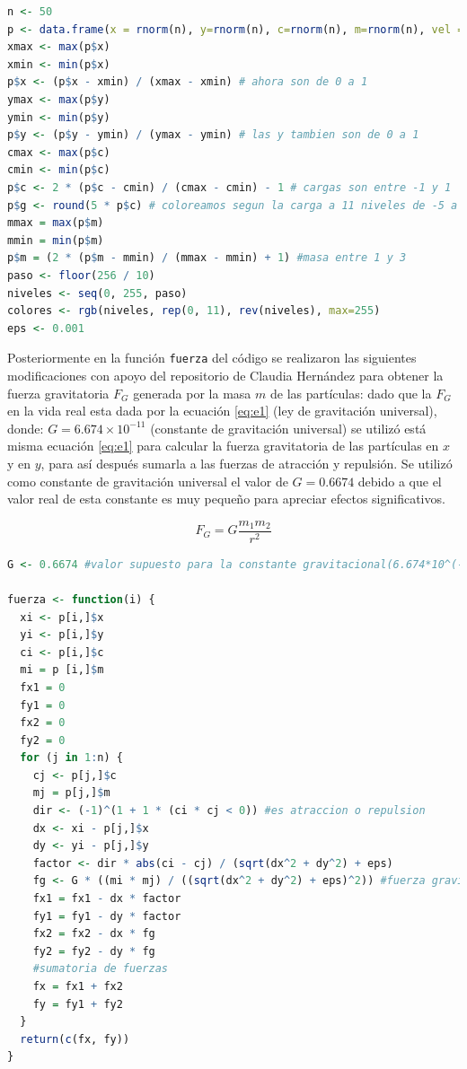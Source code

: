 \documentclass{article}
\begin{document}
\lstset{style=mystyle}
\begin{lstlisting}[language=R, caption= Código para agregar la masa $m$ con valores distribuidos normalmente al azar entre $1$ y $3$ .]
n <- 50
p <- data.frame(x = rnorm(n), y=rnorm(n), c=rnorm(n), m=rnorm(n), vel = numeric(n))
xmax <- max(p$x)
xmin <- min(p$x)
p$x <- (p$x - xmin) / (xmax - xmin) # ahora son de 0 a 1
ymax <- max(p$y)
ymin <- min(p$y)
p$y <- (p$y - ymin) / (ymax - ymin) # las y tambien son de 0 a 1
cmax <- max(p$c)
cmin <- min(p$c)
p$c <- 2 * (p$c - cmin) / (cmax - cmin) - 1 # cargas son entre -1 y 1
p$g <- round(5 * p$c) # coloreamos segun la carga a 11 niveles de -5 a 5
mmax = max(p$m) 
mmin = min(p$m)
p$m = (2 * (p$m - mmin) / (mmax - mmin) + 1) #masa entre 1 y 3
paso <- floor(256 / 10)
niveles <- seq(0, 255, paso)
colores <- rgb(niveles, rep(0, 11), rev(niveles), max=255)
eps <- 0.001
\end{lstlisting}

Posteriormente en la función \texttt{fuerza} del código se realizaron las siguientes modificaciones con apoyo del repositorio de Claudia Hernández \citep{2} para obtener la fuerza gravitatoria $F_G$ generada por la masa $m$ de las partículas: dado que la $F_G$ en la vida real esta dada por la ecuación \ref{eq:e1} (ley de gravitación universal), donde: $G= 6.674\times10^{-11}$ (constante de gravitación universal) se utilizó está misma ecuación \ref{eq:e1} para calcular la fuerza gravitatoria de las partículas en $x$ y en $y$, para así después sumarla a las fuerzas de atracción y repulsión. Se utilizó como constante de gravitación universal el valor de $G = 0.6674$ debido a que el valor real de esta constante es muy pequeño para apreciar efectos significativos.
 
\begin{equation}
\label{eq:e1}
F_G= G\frac{m_1 m_2}{r^{2}} 
\end{equation}

\newpage

\lstset{style=mystyle}
\begin{lstlisting}[language=R, caption= Código para generar fuerzas gravitacionales debido a la masa de las partículas.]
G <- 0.6674 #valor supuesto para la constante gravitacional(6.674*10^(-11))

fuerza <- function(i) { 
  xi <- p[i,]$x
  yi <- p[i,]$y
  ci <- p[i,]$c
  mi = p [i,]$m
  fx1 = 0
  fy1 = 0
  fx2 = 0
  fy2 = 0
  for (j in 1:n) {
    cj <- p[j,]$c
    mj = p[j,]$m
    dir <- (-1)^(1 + 1 * (ci * cj < 0)) #es atraccion o repulsion
    dx <- xi - p[j,]$x
    dy <- yi - p[j,]$y
    factor <- dir * abs(ci - cj) / (sqrt(dx^2 + dy^2) + eps) 
    fg <- G * ((mi * mj) / ((sqrt(dx^2 + dy^2) + eps)^2)) #fuerza gravitatoria
    fx1 = fx1 - dx * factor
    fy1 = fy1 - dy * factor
    fx2 = fx2 - dx * fg
    fy2 = fy2 - dy * fg
    #sumatoria de fuerzas
    fx = fx1 + fx2
    fy = fy1 + fy2
  }
  return(c(fx, fy))
}
\end{lstlisting}
\end{document}
